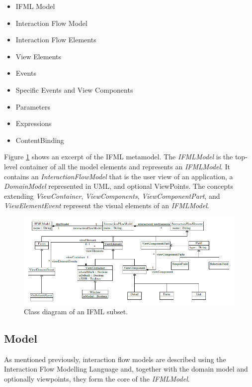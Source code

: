 \begin{itemize}
  \item IFML Model
  \item Interaction Flow Model
  \item Interaction Flow Elements
  \item View Elements
  \item Events
  \item Specific Events and View Components
  \item Parameters
  \item Expressions
  \item ContentBinding
\end{itemize}

Figure \ref{fig:simple-ifml-core-model} shows an excerpt of the IFML metamodel. The \textit{IFMLModel} is the top-level container of all the model elements and represents an \textit{IFMLModel}. It contains an \textit{InteractionFlowModel} that is the user view of an application, a \textit{DomainModel} represented in UML, and optional ViewPoints. The concepts extending \textit{ViewContainer}, \textit{ViewComponents}, \textit{ViewComponentPart}, and \textit{ViewElementEvent} represent the visual elements of an \textit{IFMLModel}.

\vspace{0.5cm}
\begin{figure}[H]
  \centering
    \includegraphics[width=15cm]{images/diagrams/ifml-metamodel.png}
  \caption{Class diagram of an IFML subset.}
  \label{fig:simple-ifml-core-model}
\end{figure}
\vspace{0.5cm}

\subsection{Model}

As mentioned previously, interaction flow models are described using the Interaction Flow Modelling Language and, together with the domain model and optionally viewpoints, they form the core of the \textit{IFMLModel}.

